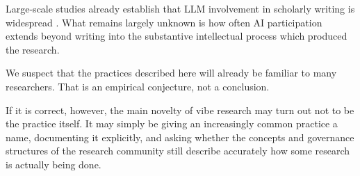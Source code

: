 \documentclass[12pt]{article}
\begin{document}
Large-scale studies already establish that LLM involvement in scholarly writing is widespread \citep{liangEtAl2024mapping,kobakEtAl2024biomedical,gray2025prevalence}. What remains largely unknown is how often AI participation extends beyond writing into the substantive intellectual process which produced the research.

We suspect that the practices described here will already be familiar to many researchers. That is an empirical conjecture, not a conclusion.

If it is correct, however, the main novelty of vibe research may turn out not to be the practice itself. It may simply be giving an increasingly common practice a name, documenting it explicitly, and asking whether the concepts and governance structures of the research community still describe accurately how some research is actually being done.



\end{document}

